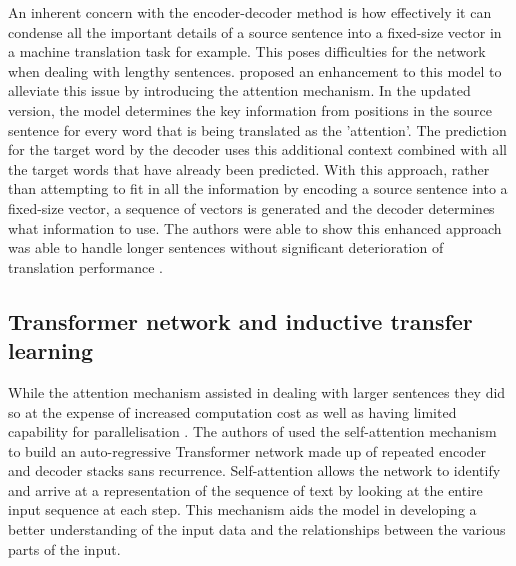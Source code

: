 An inherent concern with the encoder-decoder method is how effectively it can condense all the important details of a source sentence into a fixed-size vector in a machine translation task for example. This poses difficulties for the network when dealing with lengthy sentences. \cite{bahdanauNeuralMachineTranslation2016} proposed an enhancement to this model to alleviate this issue by introducing the attention mechanism. In the updated version, the model determines the key information from positions in the source sentence for every word that is being translated as the 'attention'. The prediction for the target word by the decoder uses this additional context combined with all the target words that have already been predicted. With this approach, rather than attempting to fit in all the information by encoding a source sentence into a fixed-size vector, a sequence of vectors is generated and the decoder determines what information to use. The authors were able to show this enhanced approach was able to handle longer sentences without significant deterioration of translation performance \cite{bahdanauNeuralMachineTranslation2016}.\\

\subsection{Transformer network and inductive transfer learning}
While the attention mechanism assisted in dealing with larger sentences they did so at the expense of increased computation cost as well as having limited capability for parallelisation \cite{vaswaniAttentionAllYou2023a}. The authors of \cite{vaswaniAttentionAllYou2023a} used the self-attention mechanism to build an auto-regressive Transformer network made up of repeated encoder and decoder stacks sans recurrence. Self-attention allows the network to identify and arrive at a representation of the sequence of text by looking at the entire input sequence at each step. This mechanism aids the model in developing a better understanding of the input data and the relationships between the various parts of the input.\\

